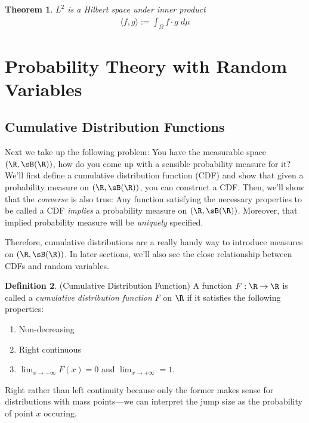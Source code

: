 \documentclass[12pt]{article}
\theoremstyle{plain}
\newtheorem{thm}{Theorem}[section]
\theoremstyle{definition}
\newtheorem{defn}[thm]{Definition}
\theoremstyle{remark}
\newcommand{\ra}{\rightarrow}
\begin{document}
\begin{thm}
$L^2$ is a Hilbert space under inner product
\begin{align*}
  \langle f,g \rangle
  := \int_\Omega f\cdot g \; d\mu
\end{align*}
\end{thm}

\clearpage
\section{Probability Theory with Random Variables}

\subsection{Cumulative Distribution Functions}

Next we take up the following problem: You have the measurable space
$(\R,\sB(\R))$, how do you come up with a sensible probability measure
for it? We'll first define a cumulative distribution function (CDF) and
show that given a probability measure on $(\R,\sB(\R))$, you can
construct a CDF. Then, we'll show that the \emph{converse} is also true:
Any function satisfying the necessary properties to be called a CDF
\emph{implies} a probability measure on $(\R,\sB(\R))$. Moreover,
that implied probability measure will be \emph{uniquely} specified.

Therefore, cumulative distributions are a really handy way to introduce
measures on $(\R,\sB(\R))$. In later sections, we'll also see the close
relationship between CDFs and random variables.

\begin{defn}(Cumulative Distribution Function)
\label{defn:cdf}
A function $F:\R\ra\R$ is called a
\emph{cumulative distribution function} $F$ on $\R$ if it satisfies the
following properties:
\begin{enumerate}
  \item Non-decreasing
  \item Right continuous
  \item $\lim_{x\ra-\infty} F(x)=0$ and $\lim_{x\ra+\infty}=1$.
\end{enumerate}
Right rather than left continuity because only the former makes sense
for distributions with mass points---we can interpret the jump size as
the probability of point $x$ occuring.
\end{defn}
\end{document}
